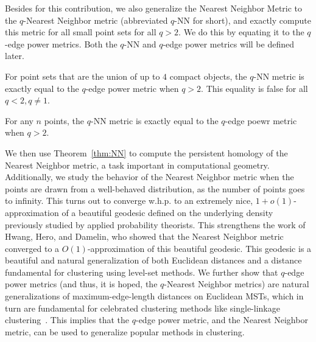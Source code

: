 Besides for this contribution, we also generalize the Nearest Neighbor
Metric to the $q$-Nearest Neighbor metric (abbreviated $q$-NN for short),
and exactly compute this metric for all small point sets for all $q>2$. We
do this by equating it to the $q$-edge power metrics. Both the $q$-NN and
$q$-edge power metrics will be defined later.
\begin{theorem} \label{thm:qNN}
For point sets that are the union of up to $4$ compact objects, the $q$-NN metric is exactly equal to
the $q$-edge power metric when $q>2$. This equality is false for all $q <
2, q\not=1$.
\end{theorem}
\begin{conjecture}\label{conj:qNN}
For any $n$ points, the $q$-NN metric is exactly equal to the $q$-edge
poewr metric when $q>2$.
\end{conjecture}

 We then use Theorem~\ref{thm:NN} to compute the persistent homology
of the Nearest Neighbor metric, a task important in computational geometry.
Additionally, we study the behavior of the Nearest Neighbor metric when the
points are drawn from a well-behaved distribution, as the number of points
goes to infinity. This turns out to converge w.h.p. to an extremely nice,
$1+o(1)$-approximation of a beautiful geodesic defined on the underlying
density previously studied by applied probability theorists. This
strengthens the work of Hwang, Hero, and Damelin, who showed that the
Nearest Neighbor metric converged to a $O(1)$-approximation of this
beautiful geodesic. This geodesic is a beautiful and natural generalization
of both Euclidean distances and a distance fundamental for clustering using
level-set methods. We further show that $q$-edge power metrics (and thus,
it is hoped, the $q$-Nearest Neighbor metrics) are natural generalizations
of maximum-edge-length distances on Euclidean MSTs, which in turn are
fundamental for celebrated clustering methods like single-linkage
clustering~\cite{}. This implies that the $q$-edge power metric, and the
Nearest Neighbor metric, can be used to generalize popular methods in
clustering.

